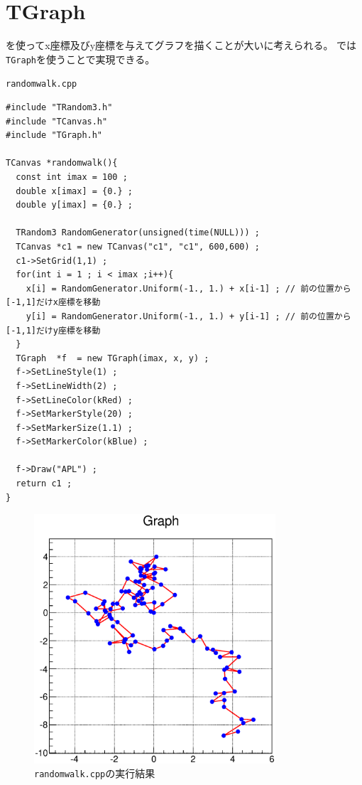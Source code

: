 \documentclass{jarticle}
\begin{document}
 \section{TGraph}
 \ROOT を使ってx座標及びy座標を与えてグラフを描くことが大いに考えられる。
 \ROOT では\verb|TGraph|を使うことで実現できる。
 \begin{itembox}{\texttt{randomwalk.cpp}}
\begin{verbatim}
#include "TRandom3.h"
#include "TCanvas.h"
#include "TGraph.h"

TCanvas *randomwalk(){
  const int imax = 100 ;
  double x[imax] = {0.} ;
  double y[imax] = {0.} ;

  TRandom3 RandomGenerator(unsigned(time(NULL))) ;
  TCanvas *c1 = new TCanvas("c1", "c1", 600,600) ;
  c1->SetGrid(1,1) ;  
  for(int i = 1 ; i < imax ;i++){
    x[i] = RandomGenerator.Uniform(-1., 1.) + x[i-1] ; // 前の位置から[-1,1]だけx座標を移動
    y[i] = RandomGenerator.Uniform(-1., 1.) + y[i-1] ; // 前の位置から[-1,1]だけy座標を移動
  }
  TGraph  *f  = new TGraph(imax, x, y) ;
  f->SetLineStyle(1) ;
  f->SetLineWidth(2) ;
  f->SetLineColor(kRed) ;
  f->SetMarkerStyle(20) ;
  f->SetMarkerSize(1.1) ;
  f->SetMarkerColor(kBlue) ;

  f->Draw("APL") ;
  return c1 ;
}
\end{verbatim}
 \end{itembox}
 \begin{figure}[htbp]
  \begin{center}
   \includegraphics[width = 90mm]{./picture/randomwalkcanvas1.eps}
  \end{center}
  \caption{\texttt{randomwalk.cpp}の実行結果}
  \label{Fig:randomwalkcanvas1}
 \end{figure}
\end{document}
